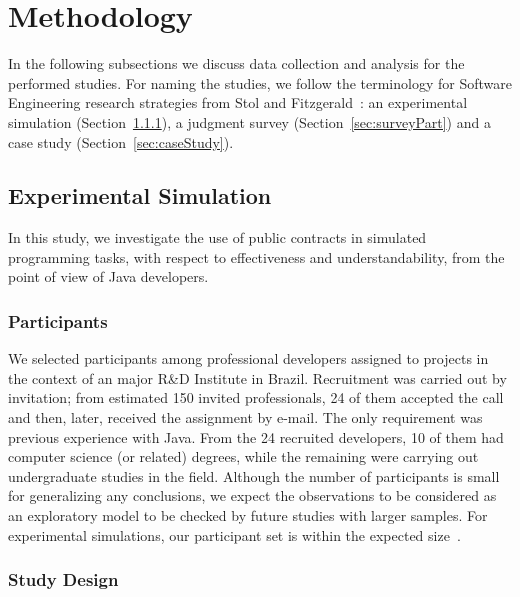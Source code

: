 \section{Methodology}
\label{sec:researchDesign}

In the following subsections we discuss data collection and analysis for the performed studies. For naming the studies, we follow the terminology for Software Engineering research strategies from Stol and Fitzgerald~\cite{Stol2015}: an experimental simulation (Section~\ref{sec:expPart}), a judgment survey (Section~\ref{sec:surveyPart}) and a case study (Section~\ref{sec:caseStudy}).

\subsection{Experimental Simulation}
\label{sec:experiment}

In this study, we investigate the use of
public contracts in simulated programming tasks, with respect to effectiveness and understandability, from the point of view of Java developers.

\subsubsection{Participants}
\label{sec:expPart}

We selected participants among professional developers assigned to projects in the context of an major R\&D Institute in Brazil. Recruitment was carried out by invitation; from estimated 150 invited professionals, 24 of them accepted the call and then, later, received the assignment by e-mail. The only requirement was previous experience with Java. From the 24 recruited developers, 10 of them had computer science (or related) degrees, while the remaining were carrying out undergraduate studies in the field. 
Although the number of participants is small for generalizing any conclusions, we expect the observations to be considered as an exploratory model to be checked by future studies with larger samples. For experimental simulations, our participant set is within the expected size~\cite{Stol2015}.


\subsubsection{Study Design}
\label{sec:studyDesign}

